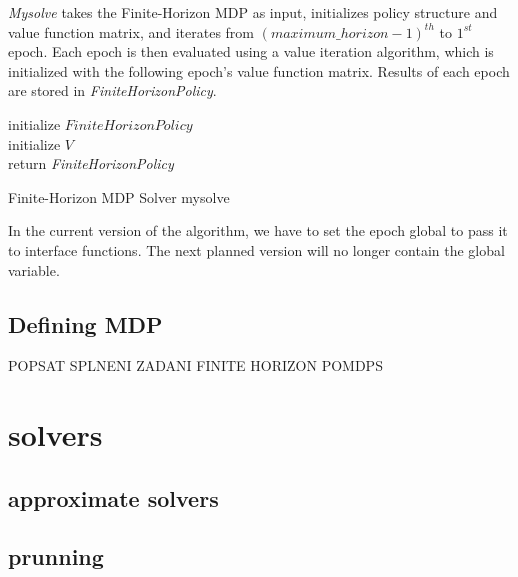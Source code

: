  \textit{Mysolve} takes the Finite-Horizon MDP as input, initializes policy structure and value function matrix, and iterates from \textit{$(maximum\_horizon-1)^{th}$} to \textit{$1^{st}$} epoch. Each epoch is then evaluated using a value iteration algorithm, which is initialized with the following epoch's value function matrix. Results of each epoch are stored in \textit{FiniteHorizonPolicy}.
 
 \LinesNumbered
\begin{algorithm}
\SetAlgoLined
initialize $FiniteHorizonPolicy$ \\
initialize $V$ \\
return \textit{FiniteHorizonPolicy}
\caption{Finite-Horizon MDP Solver mysolve}
\end{algorithm}

In the current version of the algorithm, we have to set the epoch global to pass it to interface functions. The next planned version will no longer contain the global variable.

\subsection{Defining MDP}












POPSAT SPLNENI ZADANI FINITE HORIZON POMDPS




\section{solvers}

\subsection{approximate solvers}

\subsection{prunning}

